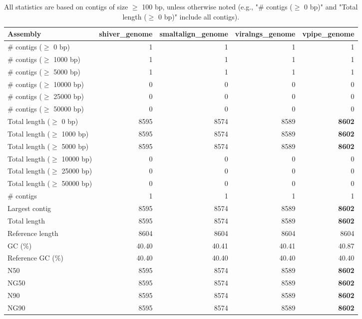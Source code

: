 \documentclass[12pt,a4paper]{article}
\begin{document}
\begin{table}[ht]
\begin{center}
\caption{All statistics are based on contigs of size $\geq$ 100 bp, unless otherwise noted (e.g., "\# contigs ($\geq$ 0 bp)" and "Total length ($\geq$ 0 bp)" include all contigs).}
\begin{tabular}{|l*{4}{|r}|}
\hline
Assembly & shiver\_genome & smaltalign\_genome & viralngs\_genome & vpipe\_genome \\ \hline
\# contigs ($\geq$ 0 bp) & 1 & 1 & 1 & 1 \\ \hline
\# contigs ($\geq$ 1000 bp) & 1 & 1 & 1 & 1 \\ \hline
\# contigs ($\geq$ 5000 bp) & 1 & 1 & 1 & 1 \\ \hline
\# contigs ($\geq$ 10000 bp) & 0 & 0 & 0 & 0 \\ \hline
\# contigs ($\geq$ 25000 bp) & 0 & 0 & 0 & 0 \\ \hline
\# contigs ($\geq$ 50000 bp) & 0 & 0 & 0 & 0 \\ \hline
Total length ($\geq$ 0 bp) & 8595 & 8574 & 8589 & {\bf 8602} \\ \hline
Total length ($\geq$ 1000 bp) & 8595 & 8574 & 8589 & {\bf 8602} \\ \hline
Total length ($\geq$ 5000 bp) & 8595 & 8574 & 8589 & {\bf 8602} \\ \hline
Total length ($\geq$ 10000 bp) & 0 & 0 & 0 & 0 \\ \hline
Total length ($\geq$ 25000 bp) & 0 & 0 & 0 & 0 \\ \hline
Total length ($\geq$ 50000 bp) & 0 & 0 & 0 & 0 \\ \hline
\# contigs & 1 & 1 & 1 & 1 \\ \hline
Largest contig & 8595 & 8574 & 8589 & {\bf 8602} \\ \hline
Total length & 8595 & 8574 & 8589 & {\bf 8602} \\ \hline
Reference length & 8604 & 8604 & 8604 & 8604 \\ \hline
GC (\%) & 40.40 & 40.41 & 40.41 & 40.87 \\ \hline
Reference GC (\%) & 40.40 & 40.40 & 40.40 & 40.40 \\ \hline
N50 & 8595 & 8574 & 8589 & {\bf 8602} \\ \hline
NG50 & 8595 & 8574 & 8589 & {\bf 8602} \\ \hline
N90 & 8595 & 8574 & 8589 & {\bf 8602} \\ \hline
NG90 & 8595 & 8574 & 8589 & {\bf 8602} \\ \hline

\end{tabular}
\end{center}
\end{table}
\end{document}
